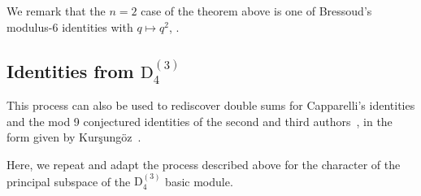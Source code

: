 \documentclass[ALCO,Unicode,published]{cedram}
\begin{document}
We remark that the $n=2$ case of the theorem above is one of Bressoud's modulus-$6$ identities with $q\mapsto q^2$, \cite{Br}.




\subsection{Identities from \texorpdfstring{$\mathrm{D}_4^{(3)}$}{D\_4\^(3)}}
This process can also be used to rediscover double sums for Capparelli's identities and the mod 9 conjectured identities of the second and third authors~\cite{KanRus-idf}, in the form given by Kur\c{s}ung\"{o}z~\cite{Kur-KR}.

Here, we repeat and adapt the process described above for the character of the principal subspace of the $\mathrm{D}_4^{(3)}$ basic module. 
\end{document}
